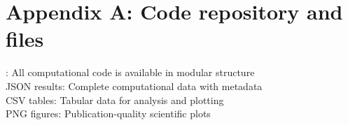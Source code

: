 \documentclass{template}
\begin{document}
\section{Appendix A: Code repository and files}

\href{https://github.com/sleipnir029/DFT-Computation}{\color{teal}{DFT-Computation}}: All computational code is available in modular structure \\
JSON results: Complete computational data with metadata\\
CSV tables: Tabular data for analysis and plotting\\
PNG figures: Publication-quality scientific plots\\



\end{document}
